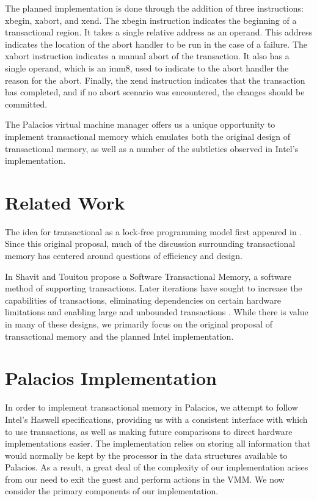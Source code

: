 \documentclass{acm_proc_article-sp}
\begin{document}
The planned implementation is done through the addition of three instructions:
xbegin, xabort, and xend. The xbegin instruction indicates the beginning of
a transactional region. It takes a single  relative address as an operand. This
address indicates the location of the abort handler to be run in the case of
a failure. The xabort instruction indicates a manual abort of the transaction.
It also has a single operand, which is an imm8, used to indicate to the abort
handler the reason for the abort. Finally, the xend instruction indicates that
the transaction has completed, and if no abort scenario was encountered,
the changes should be committed.

The Palacios virtual machine manager offers us a unique opportunity to
implement transactional memory which emulates both the original design of
transactional memory, as well as a number of the subtleties observed in 
Intel's implementation.

\section{Related Work}

The idea for transactional as a lock-free programming model first appeared in
 \cite{Herlihy:1993:TMA:173682.165164}. Since this original proposal, much of
the discussion surrounding transactional memory has centered around questions 
of efficiency and design.

In \cite{Shavit:1995:STM:224964.224987} Shavit and Touitou propose a Software
Transactional Memory, a software method of supporting transactions. Later 
iterations have sought to increase the capabilities of transactions, 
eliminating dependencies on certain hardware limitations and enabling 
large and unbounded transactions 
\cite{Ananian:2006:UTM:1116644.1116670, Hammond:2004:TMC:1028176.1006711,
Rajwar:2005:VTM:1080695.1070011}. While there is value in many of these 
designs, we primarily focus on the original proposal of transactional memory
and the planned Intel implementation.  

\section{Palacios Implementation}
In order to implement transactional memory in Palacios, we attempt to follow 
Intel's Haswell specifications, providing us with a consistent interface with which
to use transactions, as well as making future comparisons to direct hardware
implementations easier. The implementation relies on storing all information
that would normally be kept by the processor in the data structures available
to Palacios. As a result, a great deal of the complexity of our implementation
arises from our need to exit the guest and perform actions in the VMM. We now
consider the primary components of our implementation.
\end{document}
